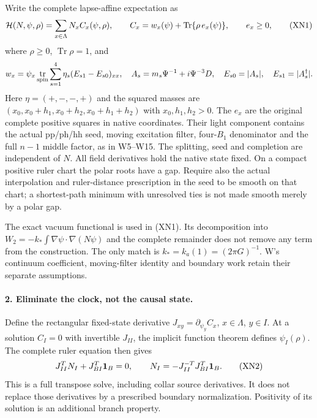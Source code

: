 \documentclass[11pt]{article}
\DeclareMathOperator{\Tr}{Tr}
\DeclareMathOperator{\tr}{tr}
\begin{document}
Write the complete lapse-affine expectation as
\begin{equation}
 {\cal H}(N,\psi,\rho)=\sum_{x\in\Lambda}N_x C_x(\psi,\rho),
 \qquad
 C_x=w_x(\psi)+\Tr\{\rho\,e_x(\psi)\},\qquad e_x\geq0 ,
 \tag{XN1}
\end{equation}
where $\rho\geq0$, $\Tr\rho=1$, and
\[
 w_x=\psi_x\tr_{\rm spin}
       \sum_{s=1}^4\eta_s(E_{s1}-E_{s0})_{xx},\quad
 A_s=m_s\Psi^{-1}+i\Psi^{-3}D,\quad
 E_{s0}=|A_s|,\quad E_{s1}=|A_s^\dagger|.
\]
Here $\eta=(+,-,-,+)$ and the squared masses are
$(x_0,x_0+h_1,x_0+h_2,x_0+h_1+h_2)$ with $x_0,h_1,h_2>0$.
The $e_x$ are the original complete positive squares in native
coordinates.  Their light component contains the actual pp/ph/hh
seed, moving excitation filter, four-$B_1$ denominator and the full
$n-1$ middle factor, as in W5--W15.  The splitting, seed and completion
are independent of $N$.  All field derivatives hold the native state
fixed.  On a compact positive ruler chart the polar roots have a gap.
Require also the actual interpolation and ruler-distance prescription
in the seed to be smooth on that chart; a shortest-path minimum with
unresolved ties is not made smooth merely by a polar gap.

The exact vacuum functional is used in (XN1).  Its decomposition into
$W_2=-k_*\int\nabla\psi\cdot\nabla(N\psi)$ and the complete remainder
does not remove any term from the construction.  The only match is
$k_*=k_a(1)=(2\pi G)^{-1}$.  W's continuum coefficient, moving-filter
identity and boundary work retain their separate assumptions.

\paragraph{2. Eliminate the clock, not the causal state.}
Define the rectangular fixed-state derivative
$J_{xy}=\partial_{\psi_y}C_x$, $x\in\Lambda$, $y\in I$.
At a solution $C_I=0$ with invertible $J_{II}$, the implicit function
theorem defines $\psi_I(\rho)$.  The complete ruler equation then gives
\begin{equation}
 J_{II}^{T}N_I+J_{BI}^{T}{\bf1}_B=0,\qquad
 N_I=-J_{II}^{-T}J_{BI}^{T}{\bf1}_B .
 \tag{XN2}
\end{equation}
This is a full transpose solve, including collar source derivatives.
It does not replace those derivatives by a prescribed boundary
normalization.  Positivity of its solution is an additional branch
property.
\end{document}
